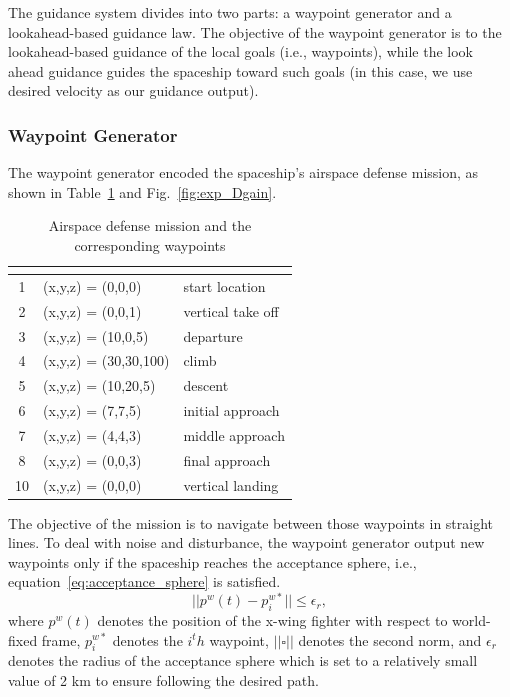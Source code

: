The guidance system divides into two parts: a waypoint generator and a lookahead-based guidance law. The objective of the waypoint generator is to the lookahead-based guidance of the local goals (i.e., waypoints), while the look ahead guidance guides the spaceship toward such goals (in this case, we use desired velocity as our guidance output).

\subsubsection{Waypoint Generator}
The waypoint generator encoded the spaceship's airspace defense mission, as shown in Table~\ref{tab:waypoint} and Fig.~\ref{fig:exp_Dgain}. 

\begin{table}[!h]
	\caption{Airspace defense mission and the corresponding waypoints}
	\centering
	
	\begin{tabular}{@{}cll@{}}
		\toprule
		\textbf{\rotatebox[origin=c]{0}{ {index}}}  & 
		\textbf{\rotatebox[origin=c]{0}{waypoint (km)}}& 
		\textbf{\rotatebox[origin=c]{0}{description}}
		\\ \toprule
		1 & (x,y,z) = (0,0,0) & start location\\ 
		2 & (x,y,z) = (0,0,1) & vertical take off\\ 
		3 & (x,y,z) = (10,0,5) & departure \\ 
		4 & (x,y,z) = (30,30,100) & climb\\ 
		5 & (x,y,z) = (10,20,5) & descent \\ 
		6 & (x,y,z) = (7,7,5) & initial approach\\ 
		7 & (x,y,z) = (4,4,3) & middle approach\\ 
		8 & (x,y,z) = (0,0,3) & final approach \\ 
		10 & (x,y,z) = (0,0,0) & vertical landing \\ 
		\bottomrule
	\end{tabular}
	\label{tab:waypoint}
\end{table}

The objective of the mission is to navigate between those waypoints in straight lines. To deal with noise and disturbance, the waypoint generator output new waypoints only if the spaceship reaches the acceptance sphere, i.e., equation~\ref{eq:acceptance_sphere} is satisfied.
\begin{equation}
	||p^w(t) - p_i^{w*} || \leq \epsilon_r,
	\label{eq:acceptance_sphere}
\end{equation}
where $p^w(t)$ denotes the position of the x-wing fighter with respect to world-fixed frame, $p_i^{w*}$ denotes the $i^th$ waypoint, $||\square||$ denotes the second norm, and $\epsilon_r$ denotes the radius of the acceptance sphere which is set to a relatively small value of 2 km to ensure following the desired path. 


